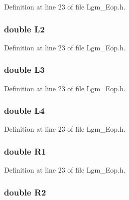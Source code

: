 Definition at line 23 of file Lgm\_\-Eop.h.\hypertarget{struct_lgm___nga_eopp_cd277e5dc13a99d961be4cfe051cfa9a}{
\subsubsection[{L2}]{\setlength{\rightskip}{0pt plus 5cm}double {\bf L2}}}
\label{struct_lgm___nga_eopp_cd277e5dc13a99d961be4cfe051cfa9a}




Definition at line 23 of file Lgm\_\-Eop.h.\hypertarget{struct_lgm___nga_eopp_613253fbbc937149391f83cefec8e022}{
\subsubsection[{L3}]{\setlength{\rightskip}{0pt plus 5cm}double {\bf L3}}}
\label{struct_lgm___nga_eopp_613253fbbc937149391f83cefec8e022}




Definition at line 23 of file Lgm\_\-Eop.h.\hypertarget{struct_lgm___nga_eopp_81588e63425dc1795208aafbb8095e5e}{
\subsubsection[{L4}]{\setlength{\rightskip}{0pt plus 5cm}double {\bf L4}}}
\label{struct_lgm___nga_eopp_81588e63425dc1795208aafbb8095e5e}




Definition at line 23 of file Lgm\_\-Eop.h.\hypertarget{struct_lgm___nga_eopp_f404f6d9a332838b9707056c27a4f21a}{
\subsubsection[{R1}]{\setlength{\rightskip}{0pt plus 5cm}double {\bf R1}}}
\label{struct_lgm___nga_eopp_f404f6d9a332838b9707056c27a4f21a}




Definition at line 23 of file Lgm\_\-Eop.h.\hypertarget{struct_lgm___nga_eopp_6e4ea5fe1993f05924fa4d457def2aa3}{
\subsubsection[{R2}]{\setlength{\rightskip}{0pt plus 5cm}double {\bf R2}}}
\label{struct_lgm___nga_eopp_6e4ea5fe1993f05924fa4d457def2aa3}




